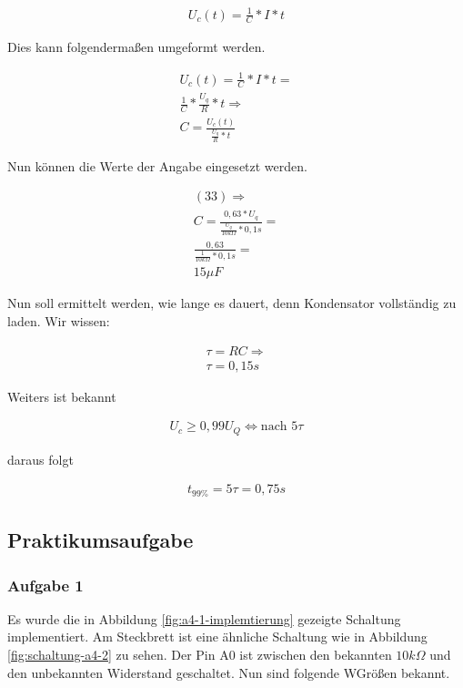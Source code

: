 \begin{align}
    U_c(t) = \frac{1}{C} * I * t
\end{align}

Dies kann folgendermaßen umgeformt werden.

\begin{align}
    U_c(t) = \frac{1}{C} * I * t = \\
    \frac{1}{C} * \frac{U_q}{R} * t \Rightarrow \\
    C = \frac{U_c(t)}{\frac{U_q}{R} * t}
\end{align}

Nun können die Werte der Angabe eingesetzt werden.

\begin{align}
    (33) \Rightarrow \\
    C = \frac{0,63 * U_q}{\frac{U_q}{10k\Omega} * 0,1s} = \\
    \frac{0,63}{\frac{1}{10k\Omega} * 0,1s} = \\
    15\mu F
\end{align}

Nun soll ermittelt werden, wie lange es dauert, denn Kondensator vollständig zu laden.
Wir wissen:

\begin{align}
    \tau = RC \Rightarrow \\
    \tau = 0,15s
\end{align}

Weiters ist bekannt

\begin{align}
    U_c \geq 0,99U_Q \Leftrightarrow \text{nach } 5\tau
\end{align}

daraus folgt

\begin{align}
    t_{99\%} = 5\tau = 0,75s
\end{align}

\subsection{Praktikumsaufgabe}
\label{subsec:a4-praktikumsaufgabe2}

\subsubsection{Aufgabe 1}

Es wurde die in Abbildung \ref{fig:a4-1-implemtierung} gezeigte Schaltung implementiert.
Am Steckbrett ist eine ähnliche Schaltung wie in Abbildung \ref{fig:schaltung-a4-2} zu sehen.
Der Pin A0 ist zwischen den bekannten $10k\Omega$ und den unbekannten Widerstand geschaltet.
Nun sind folgende WGrößen bekannt.

